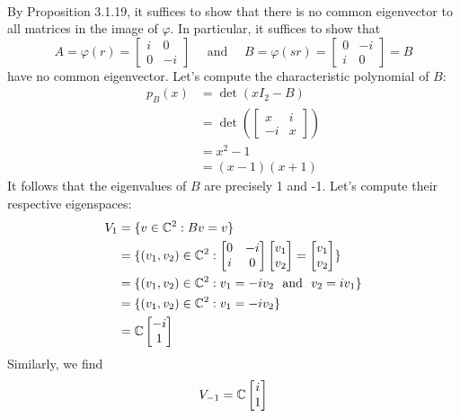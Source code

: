 \begin{solution}
    \\ By Proposition 3.1.19, it suffices to show that there is no common eigenvector to all matrices in the image of $\varphi$. In particular, it suffices to show that 
    $$A = \varphi(r) = \begin{bmatrix}i & 0 \\ 0 & -i\end{bmatrix} \quad \text{ and } \quad B = \varphi(sr) = \begin{bmatrix}0 & -i \\ i & 0 \end{bmatrix} = B$$
    have no common eigenvector. Let's compute the characteristic polynomial of $B$:
    \begin{align*}
        p_B(x) &= \det(xI_2 - B) \\
        &= \det \left(\begin{bmatrix}x & i \\ -i & x \end{bmatrix}\right) \\
        &= x^2 - 1 \\
        &= (x-1)(x+1)
    \end{align*}
    It follows that the eigenvalues of $B$ are precisely 1 and -1. Let's compute their respective eigenspaces:
    \begin{align*}
        V_1 &= \{v \in \mathbb{C}^2 : Bv = v\} \\
        &= \{(v_1, v_2) \in \mathbb{C}^2 : \begin{bmatrix}0 & -i \\ i & 0 \end{bmatrix}\begin{bmatrix}v_1 \\ v_2 \end{bmatrix} = \begin{bmatrix}v_1 \\ v_2 \end{bmatrix} \} \\
        &= \{(v_1, v_2) \in \mathbb{C}^2 : v_1 = -iv_2 \ \text{ and } \ v_2 = iv_1\} \\
        &= \{(v_1, v_2) \in \mathbb{C}^2 : v_1 = -iv_2\} \\
        &= \mathbb{C} \begin{bmatrix}-i \\ 1 \end{bmatrix}
    \end{align*}
    Similarly, we find
    $$V_{-1} = \mathbb{C} \begin{bmatrix}i \\ 1 \end{bmatrix}$$

\end{solution}
